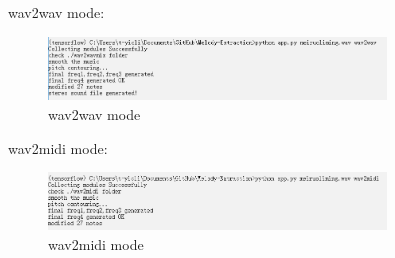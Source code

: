 \documentclass[twoside]{article}
\begin{document}
wav2wav mode:
\begin{figure}[H]
   \centering
   \includegraphics[width = 0.8\textwidth]{wav2wav.PNG}  
   \caption{wav2wav mode}
\end{figure}

wav2midi mode:
\begin{figure}[H]
   \centering
   \includegraphics[width = 0.8\textwidth]{wav2midi.PNG}  
   \caption{wav2midi mode}
\end{figure}
\end{document}
